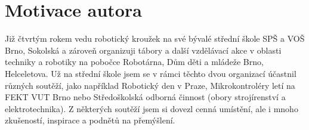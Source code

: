 
\addtocounter{footnote}{-1} %



%

\section{Motivace autora}

Již čtvrtým rokem vedu robotický kroužek na své bývalé střední škole SPŠ a VOŠ Brno, Sokolská a zároveň organizuji tábory a další vzdělávací akce v oblasti techniky a robotiky na pobočce Robotárna, Dům děti a mládeže Brno, Helceletova.
Už na střední škole jsem se v rámci těchto dvou organizací účastnil různých soutěží, jako například Robotický den v Praze, Mikrokontroléry letí na FEKT VUT Brno nebo Středoškolská odborná činnost (obory strojírenství a elektrotechnika). 
Z některých soutěží jsem si dovezl cenná umístění, ale i mnoho zkušeností, inspirace a podnětů na přemýšlení.
% 
% 
%
%

